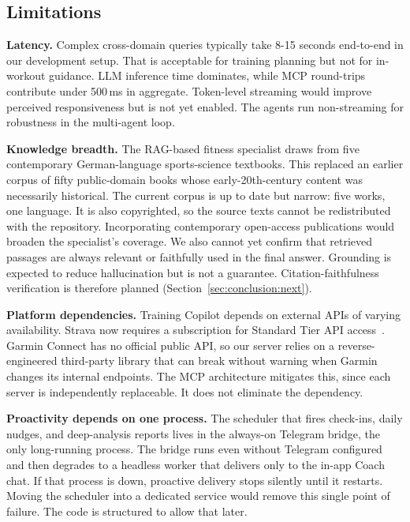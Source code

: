 

\subsection{Limitations}\label{sec:discussion:limitations}

\textbf{Latency.} Complex cross-domain queries typically take 8-15 seconds end-to-end in our development setup. That is acceptable for training planning but not for in-workout guidance. LLM inference time dominates, while MCP round-trips contribute under 500\,ms in aggregate. Token-level streaming would improve perceived responsiveness but is not yet enabled. The agents run non-streaming for robustness in the multi-agent loop.

\textbf{Knowledge breadth.} The RAG-based fitness specialist draws from five contemporary German-language sports-science textbooks. This replaced an earlier corpus of fifty public-domain books whose early-20th-century content was necessarily historical. The current corpus is up to date but narrow: five works, one language. It is also copyrighted, so the source texts cannot be redistributed with the repository. Incorporating contemporary open-access publications would broaden the specialist's coverage. We also cannot yet confirm that retrieved passages are always relevant or faithfully used in the final answer. Grounding is expected to reduce hallucination but is not a guarantee. Citation-faithfulness verification is therefore planned (Section~\ref{sec:conclusion:next}).

\textbf{Platform dependencies.} Training Copilot depends on external APIs of varying availability. Strava now requires a subscription for Standard Tier API access~\citep{strava_api_update_2026}. Garmin Connect has no official public API, so our server relies on a reverse-engineered third-party library that can break without warning when Garmin changes its internal endpoints. The MCP architecture mitigates this, since each server is independently replaceable. It does not eliminate the dependency.

\textbf{Proactivity depends on one process.} The scheduler that fires check-ins, daily nudges, and deep-analysis reports lives in the always-on Telegram bridge, the only long-running process. The bridge runs even without Telegram configured and then degrades to a headless worker that delivers only to the in-app Coach chat. If that process is down, proactive delivery stops silently until it restarts. Moving the scheduler into a dedicated service would remove this single point of failure. The code is structured to allow that later.

